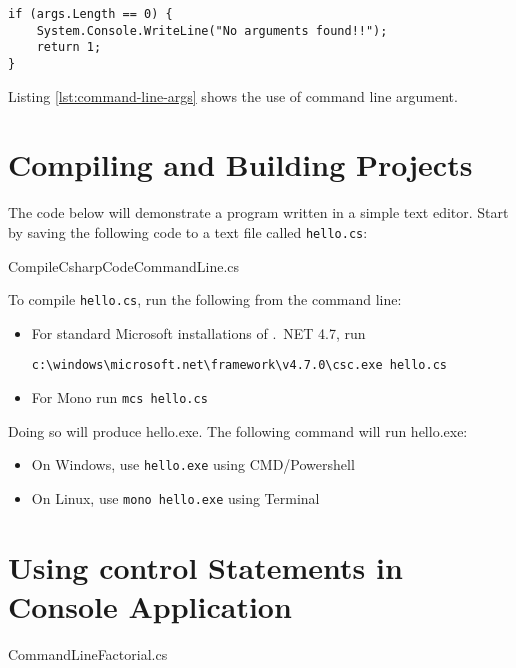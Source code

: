 \begin{lstlisting}[numbers=none]
if (args.Length == 0) {
	System.Console.WriteLine("No arguments found!!");
	return 1;
}
\end{lstlisting}

Listing \ref{lst:command-line-args} shows the use of command line argument. 


\section{Compiling and Building Projects}
The code below will demonstrate a {\cs} program written in a simple text editor. Start by
saving the following code to a text file called \verb|hello.cs|:

 {CompileCsharpCodeCommandLine.cs}

To compile \verb|hello.cs|, run the following from the command line:

\begin{itemize}
\item For standard Microsoft installations of .\ NET 4.7, run 
\begin{verbatim}
c:\windows\microsoft.net\framework\v4.7.0\csc.exe hello.cs
\end{verbatim}
\item For Mono run \verb|mcs hello.cs|
\end{itemize}

Doing so will produce hello.exe. The following command will run hello.exe:
 
\begin{itemize}
\item On Windows, use \verb|hello.exe| using CMD/Powershell
\item On Linux, use \verb|mono hello.exe| using Terminal
\end{itemize}


\section{Using control Statements in Console Application}
 {CommandLineFactorial.cs}

\newpage\thispagestyle{empty}
